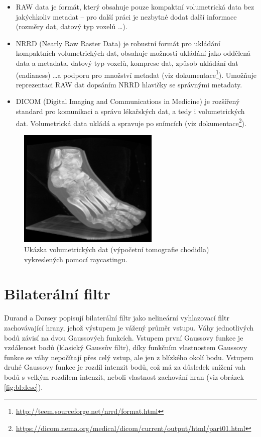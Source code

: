 \begin{itemize}
    \item RAW data je formát, který obsahuje pouze kompaktní volumetrická data bez jakýchkoliv metadat -- pro další práci je nezbytné  dodat další informace (rozměry dat, datový typ voxelů \dots).
    \item NRRD (Nearly Raw Raster Data) je robustní formát pro ukládání kompaktních volumetrických dat, obsahuje možnosti ukládání jako oddělená data a metadata, datový typ voxelů, komprese dat, způsob ukládání dat (endianess) \dots a podporu pro množství metadat (viz dokumentace\footnote{\url{http://teem.sourceforge.net/nrrd/format.html}}). Umožňuje reprezentaci RAW dat dopsáním NRRD hlavičky se správnými metadaty.
    \item DICOM (Digital Imaging and Communications in Medicine) je rozšířený standard pro komunikaci a správu lékařských dat, a tedy i volumetrických dat. Volumetrická data ukládá a spravuje po snímcích (viz dokumentace\footnote{\url{https://dicom.nema.org/medical/dicom/current/output/html/part01.html}}).
\end{itemize}

\begin{figure} [H]
    \centering
    \label{fig:vol:foot}
    \includegraphics[width=0.60\textwidth]{figures/ct-foot.png}
    \caption{Ukázka volumetrických dat (výpočetní tomografie chodidla) vykreslených pomocí raycastingu.}
\end{figure}

\section{Bilaterální filtr}
\label{sec:theory:bl}
Durand a Dorsey \cite{bl2002:durand} popisují bilaterální filtr jako nelineární vyhlazovací filtr zachovávající hrany, jehož výstupem je vážený průměr vstupu. Váhy jednotlivých bodů závisí na dvou Gaussových funkcích. Vstupem první Gaussovy funkce je vzdálenost bodů (klasický Gaussův filtr), díky funkčním vlastnostem Gaussovy funkce se váhy nepočítají přes celý vstup, ale jen z blízkého okolí bodu. Vstupem druhé Gaussovy funkce je rozdíl intenzit bodů, což má za důsledek snížení vah bodů s velkým rozdílem intenzit, neboli vlastnost zachování hran (viz obrázek \ref{fig:bl:desc}).

